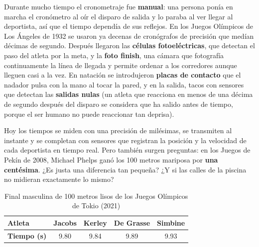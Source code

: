 Durante mucho tiempo el cronometraje fue \textbf{manual}: una persona ponía en marcha el cronómetro al oír el disparo de salida y lo
paraba al ver llegar al deportista, así que el tiempo dependía de sus reflejos. En los Juegos Olímpicos de Los Ángeles de 1932 se
usaron ya decenas de cronógrafos de precisión que medían décimas de segundo. Después llegaron las \textbf{células fotoeléctricas},
que detectan el paso del atleta por la meta, y la \textbf{foto finish}, una cámara que fotografía continuamente la línea de llegada
y permite ordenar a los corredores aunque lleguen casi a la vez. En natación se introdujeron \textbf{placas de contacto} que el
nadador pulsa con la mano al tocar la pared, y en la salida, tacos con sensores que detectan las \textbf{salidas nulas} (un atleta
que reacciona en menos de una décima de segundo después del disparo se considera que ha salido antes de tiempo, porque el ser humano
no puede reaccionar tan deprisa).

Hoy los tiempos se miden con una precisión de milésimas, se transmiten al instante y se completan con sensores que registran la
posición y la velocidad de cada deportista en tiempo real. Pero también surgen preguntas: en los Juegos de Pekín de 2008, Michael
Phelps ganó los 100 metros mariposa por \textbf{una centésima}. ¿Es justa una diferencia tan pequeña? ¿Y si las calles de la
piscina no midieran exactamente lo mismo?

\begin{table}[H]
    \centering
    \caption{Final masculina de 100 metros lisos de los Juegos Olímpicos de Tokio (2021)}
    \vspace{-5pt}
    \begin{tabular}{@{}lcccc@{}}
        \toprule
        \textbf{Atleta} & Jacobs & Kerley & De Grasse & Simbine \\
        \midrule
        \textbf{Tiempo (s)} & \num{9.80} & \num{9.84} & \num{9.89} & \num{9.93} \\
        \bottomrule
    \end{tabular}
    \label{tab:ud8-tokio}
\end{table}

